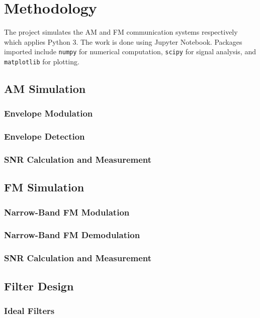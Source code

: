 \documentclass[../ECE459FinalProjectReport.tex]{subfiles}
\begin{document}
\chapter{Methodology}
The project simulates the AM and FM communication systems respectively which applies Python 3. The work is done using Jupyter Notebook. Packages imported include \verb|numpy| for numerical computation, \verb|scipy| for signal analysis, and \verb|matplotlib| for plotting.

\section{AM Simulation}
\subsection{Envelope Modulation}

\subsection{Envelope Detection}

\subsection{SNR Calculation and Measurement}

\section{FM Simulation}
\subsection{Narrow-Band FM Modulation}

\subsection{Narrow-Band FM Demodulation}

\subsection{SNR Calculation and Measurement}

\section{Filter Design}
\subsection{Ideal Filters}
\end{document}
